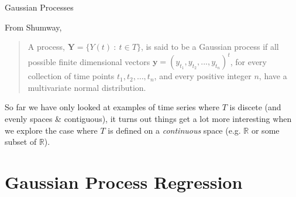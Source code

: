 \documentclass[11pt,ignorenonframetext,]{beamer}
\begin{document}
\begin{frame}[t]{%
\protect\hypertarget{gaussian-processes}{%
Gaussian Processes}}

From Shumway,

\vspace{5mm}

\begin{quote}
A process, \(\symbf{Y} = \{Y(t) ~:~ t \in T\}\), is said to be a
Gaussian process if all possible finite dimensional vectors
\(\symbf{y} = (y_{t_1},y_{t_2},...,y_{t_n})^t\), for every collection of
time points \(t_1, t_2, \ldots , t_n\), and every positive integer
\(n\), have a multivariate normal distribution.
\end{quote}

\pause

So far we have only looked at examples of time series where \(T\) is
discete (and evenly spaces \& contiguous), it turns out things get a lot
more interesting when we explore the case where \(T\) is defined on a
\emph{continuous} space (e.g. \(\mathbb{R}\) or some subset of
\(\mathbb{R}\)).

\end{frame}

\hypertarget{gaussian-process-regression}{%
\section{Gaussian Process
Regression}\label{gaussian-process-regression}}
\end{document}

